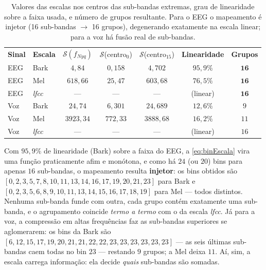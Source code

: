 			\begin{table}[H]
				\centering
				\caption[Valores das escalas nos extremos e agrupamento resultante]{Valores das escalas nos centros das sub-bandas extremas, grau de linearidade sobre a faixa usada, e número de grupos resultante. Para o EEG o mapeamento é injetor (16 sub-bandas $\to$ 16 grupos), degenerando exatamente na escala linear; para a voz há fusão real de sub-bandas.}
				\label{tab:escalaValores}
				\tableZebraStripe
				\begin{tabular}{@{}llccccc@{}}
					\tableHeaderRow \textbf{Sinal} & \textbf{Escala} & $\mathcal{S}(f_{Nyq})$ & $\mathcal{S}$(centro$_0$) & $\mathcal{S}$(centro$_{15}$) & \textbf{Linearidade} & \textbf{Grupos} \\
					EEG & Bark & $4{,}84$    & $0{,}158$  & $4{,}702$   & $95{,}9\%$ & $\mathbf{16}$ \\
					EEG & Mel  & $618{,}66$  & $25{,}47$  & $603{,}68$  & $76{,}5\%$ & $\mathbf{16}$ \\
					EEG & \textit{lfcc} & --- & --- & --- & (linear) & $\mathbf{16}$ \\
					Voz & Bark & $24{,}74$   & $6{,}301$  & $24{,}689$  & $12{,}6\%$ & $9$ \\
					Voz & Mel  & $3923{,}34$ & $772{,}33$ & $3888{,}68$ & $16{,}2\%$ & $11$ \\
					Voz & \textit{lfcc} & --- & --- & --- & (linear) & $16$ \\
					\bottomrule
				\end{tabular}
			\end{table}

			\par Com $95{,}9\%$ de linearidade (Bark) sobre a faixa do EEG, a \autoref{eq:binEscala} vira uma função praticamente afim e monótona, e como há $24$ (ou $20$) bins para apenas $16$ sub-bandas, o mapeamento resulta \textbf{injetor}: os bins obtidos são $[0, 2, 3, 5, 7, 8, 10, 11, 13, 14, 16, 17, 19, 20, 21, 23]$ para Bark e $[0, 2, 3, 5, 6, 8, 9, 10, 11, 13, 14, 15, 16, 17, 18, 19]$ para Mel --- todos distintos. Nenhuma sub-banda funde com outra, cada grupo contém exatamente uma sub-banda, e o agrupamento coincide \emph{termo a termo} com o da escala \textit{lfcc}. Já para a voz, a compressão em altas frequências faz as sub-bandas superiores se aglomerarem: os bins da Bark são $[6, 12, 15, 17, 19, 20, 21, 21, 22, 22, 23, 23, 23, 23, 23, 23]$ --- as seis últimas sub-bandas caem todas no bin $23$ --- restando $9$ grupos; a Mel deixa $11$. Aí, sim, a escala carrega informação: ela decide \emph{quais} sub-bandas são somadas.

